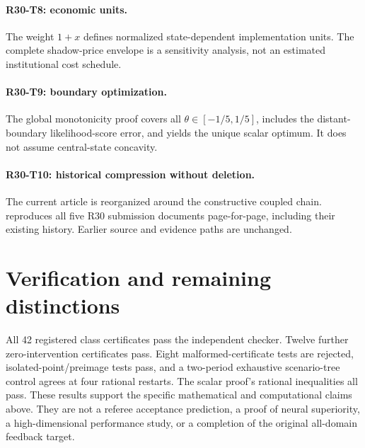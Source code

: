 \paragraph{R30-T8: economic units.} The weight $1+x$ defines normalized state-dependent implementation units. The complete shadow-price envelope is a sensitivity analysis, not an estimated institutional cost schedule.
\paragraph{R30-T9: boundary optimization.} The global monotonicity proof covers all $\theta\in[-1/5,1/5]$, includes the distant-boundary likelihood-score error, and yields the unique scalar optimum. It does not assume central-state concavity.
\paragraph{R30-T10: historical compression without deletion.} The current article is reorganized around the constructive coupled chain.  reproduces all five R30 submission documents page-for-page, including their existing history. Earlier source and evidence paths are unchanged.

\section{Verification and remaining distinctions}
All 42 registered class certificates pass the independent checker. Twelve further zero-intervention certificates pass. Eight malformed-certificate tests are rejected, isolated-point/preimage tests pass, and a two-period exhaustive scenario-tree control agrees at four rational restarts. The scalar proof's rational inequalities all pass. These results support the specific mathematical and computational claims above. They are not a referee acceptance prediction, a proof of neural superiority, a high-dimensional performance study, or a completion of the original all-domain feedback target.
